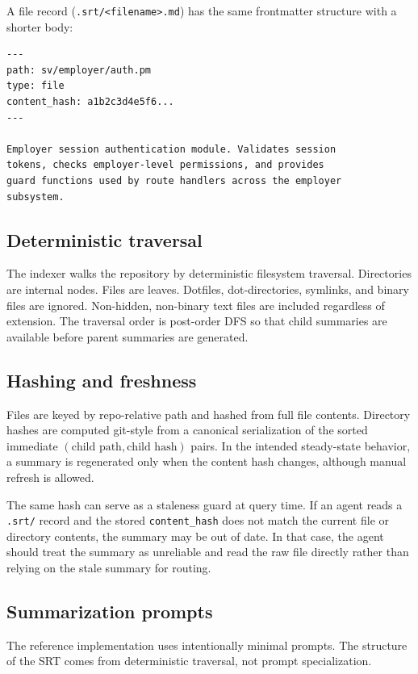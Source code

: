 \documentclass[11pt,a4paper]{article}
\newcommand{\srt}{\textsc{SRT}}
\begin{document}
A file record (\texttt{.srt/<filename>.md}) has the same frontmatter structure with a shorter body:

\begin{verbatim}
---
path: sv/employer/auth.pm
type: file
content_hash: a1b2c3d4e5f6...
---

Employer session authentication module. Validates session
tokens, checks employer-level permissions, and provides
guard functions used by route handlers across the employer
subsystem.
\end{verbatim}

\subsection{Deterministic traversal}
The indexer walks the repository by deterministic filesystem traversal. Directories are internal nodes. Files are leaves. Dotfiles, dot-directories, symlinks, and binary files are ignored. Non-hidden, non-binary text files are included regardless of extension. The traversal order is post-order DFS so that child summaries are available before parent summaries are generated.

\subsection{Hashing and freshness}
Files are keyed by repo-relative path and hashed from full file contents. Directory hashes are computed git-style from a canonical serialization of the sorted immediate \((\text{child path}, \text{child hash})\) pairs. In the intended steady-state behavior, a summary is regenerated only when the content hash changes, although manual refresh is allowed.

The same hash can serve as a staleness guard at query time.
If an agent reads a \texttt{.srt/} record and the stored \texttt{content\_hash} does not match the current file or directory contents, the summary may be out of date.
In that case, the agent should treat the summary as unreliable and read the raw file directly rather than relying on the stale summary for routing.

\subsection{Summarization prompts}\label{app:prompts}

The reference implementation uses intentionally minimal prompts.
The structure of the \srt{} comes from deterministic traversal, not prompt specialization.
\end{document}
